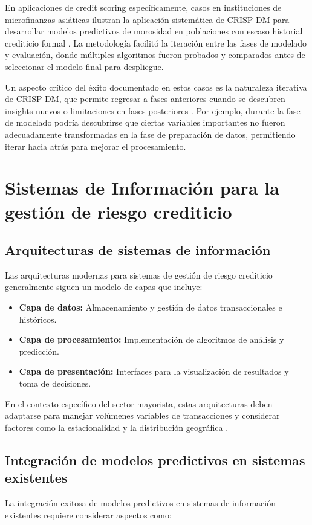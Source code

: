 En aplicaciones de credit scoring específicamente, casos en instituciones de microfinanzas asiáticas ilustran la aplicación sistemática de CRISP-DM para desarrollar modelos predictivos de morosidad en poblaciones con escaso historial crediticio formal \cite{martinez2019crisp}. La metodología facilitó la iteración entre las fases de modelado y evaluación, donde múltiples algoritmos fueron probados y comparados antes de seleccionar el modelo final para despliegue.

Un aspecto crítico del éxito documentado en estos casos es la naturaleza iterativa de CRISP-DM, que permite regresar a fases anteriores cuando se descubren insights nuevos o limitaciones en fases posteriores \cite{wirth2000crisp}. Por ejemplo, durante la fase de modelado podría descubrirse que ciertas variables importantes no fueron adecuadamente transformadas en la fase de preparación de datos, permitiendo iterar hacia atrás para mejorar el procesamiento.

\section{Sistemas de Información para la gestión de riesgo crediticio}
\subsection{Arquitecturas de sistemas de información}
Las arquitecturas modernas para sistemas de gestión de riesgo crediticio generalmente siguen un modelo de capas que incluye:

\begin{itemize}
    \item \textbf{Capa de datos:} Almacenamiento y gestión de datos transaccionales e históricos.
    \item \textbf{Capa de procesamiento:} Implementación de algoritmos de análisis y predicción.
    \item \textbf{Capa de presentación:} Interfaces para la visualización de resultados y toma de decisiones.
\end{itemize}

En el contexto específico del sector mayorista, estas arquitecturas deben adaptarse para manejar volúmenes variables de transacciones y considerar factores como la estacionalidad y la distribución geográfica \cite{ramirez2023predictive}.

\subsection{Integración de modelos predictivos en sistemas existentes}
La integración exitosa de modelos predictivos en sistemas de información existentes requiere considerar aspectos como:

